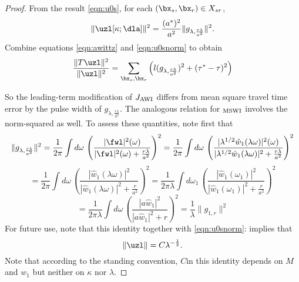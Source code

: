 \begin{proof}
From the result \ref{eqn:u0s}, for each
$(\bx_s,\bx_r) \in X_{sr}$,
\begin{equation}
  \label{eqn:u0snorm}
  \|\uzl[\kappa;\dla]\|^2=
  \frac{(a^*)^2}{a^2}\|g_{\lambda,\frac{r\lambda}{a^2}}\|^2.
\end{equation}
Combine equations \ref{eqn:awittz} and \ref{eqn:u0snorm} to obtain
\begin{equation}
  \label{eqn:AWIasym2}
  \frac{\|T\uzl\|^2}{\|\uzl\|^2}= \sum_{\bx_s,\bx_r} \left(l(g_{\lambda,\frac{r\lambda}{a^2}})^2  + (\tau^*-\tau)^2\right)
 \end{equation}

So the leading-term modification of $J_{\rm AWI}$ differs from mean square
travel time error by the pulse width of
$g_{\lambda,\frac{r\lambda}{a^2}}$. The analogous relation for $_{\rm
  MSWI}$ involves the norm-squared as well. To assess these
quantities, note first that
\[
  \|g_{\lambda,\frac{r\lambda}{a^2}}\|^2 =\frac{1}{2\pi} \int d\omega\,
  \left(\frac{|\fwl|^2(\omega)}{|\fwl|^2(\omega) + \frac{r\lambda}{a^2}}\right)^2
=\frac{1}{2\pi} \int d\omega\,
  \left(\frac{|\lambda^{1/2}\hat{w}_1(\lambda
      \omega)|^2(\omega)}{|\lambda^{1/2}\hat{w}_1(\lambda
      \omega)|^2 + \frac{r\lambda}{a^2}}\right)^2
\]
\[
=\frac{1}{2\pi}\int d\omega\,
  \left(\frac{|\hat{w}_1(\lambda
      \omega)|^2}{|\hat{w}_1(\lambda
      \omega)|^2 + \frac{r}{a^2}}\right)^2
=  \frac{1}{2\pi \lambda} \int d\omega_1\,
  \left(\frac{|\hat{w}_1(\omega_1)|^2}{|\hat{w}_1(\omega_1)|^2 +
      \frac{r}{a^2}}\right)^2 
\]
\begin{equation}
  \label{eqn:g0}
  = \frac{1}{2\pi \lambda} \int d\omega\,
  \left(\frac{|a\hat{w}_1|^2}{|a\hat{w}_1|^2 + r}\right)^2 =
  \frac{1}{\lambda} \|g_{1,r}\|^2
\end{equation}
For future use, note that this identity together with \ref{eqn:u0snorm}: implies that
\begin{equation}
    \label{eqn:u0snormlam}
  \|\uzl\| = C\lambda^{-\frac{1}{2}}.
\end{equation}
Note that according to the standing convention, $C$in this identity
depends on $M$ and $w_1$ but neither on $\kappa$ nor $\lambda$.


\end{proof}
